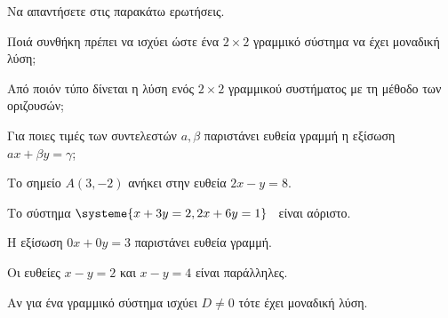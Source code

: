 \vspace{-7mm}
\begin{erwthma}
\item Να απαντήσετε στις παρακάτω ερωτήσεις.
\begin{rlist}[leftmargin=3mm]
\item Ποιά συνθήκη πρέπει να ισχύει ώστε ένα $ 2\times2 $ γραμμικό σύστημα να έχει μοναδική λύση;
\item Από ποιόν τύπο δίνεται η λύση ενός $ 2\times2 $ γραμμικού συστήματος με τη μέθοδο των οριζουσών;
\item Για ποιες τιμές των συντελεστών $ a,\beta $ παριστάνει ευθεία γραμμή η εξίσωση $ ax+\beta y=\gamma $;
\end{rlist}
\item \swstolathos
\begin{rlist}[leftmargin=3mm]
\item Το σημείο $ A(3,-2) $ ανήκει στην ευθεία $ 2x-y=8 $.
\item Το σύστημα $ \systeme{x+3y=2,2x+6y=1} $ \ είναι αόριστο.
\item Η εξίσωση $ 0x+0y=3 $ παριστάνει ευθεία γραμμή.
\item Οι ευθείες $ x-y=2 $ και $ x-y=4 $ είναι παράλληλες.
\item Αν για ένα γραμμικό σύστημα ισχύει $ D\neq0 $ τότε έχει μοναδική λύση.
\end{rlist}
\end{erwthma}
